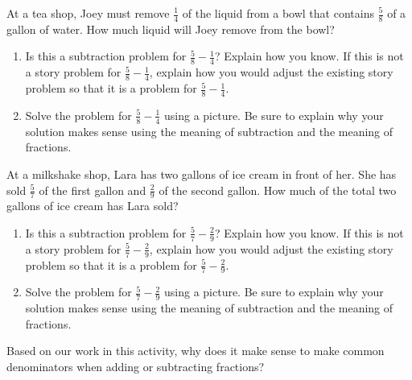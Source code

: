 \documentclass[nooutcomes,noauthor, handout]{ximera}
\begin{document}
\begin{problem}
At a tea shop, Joey must remove $\frac{1}{4}$ of the liquid from a bowl that contains $\frac{5}{8}$ of a gallon of water. How much liquid will Joey remove from the bowl?

\begin{enumerate}
	\item Is this a subtraction problem for $\frac{5}{8} - \frac{1}{4}$? Explain how you know.  If this is not a story problem for  $\frac{5}{8} - \frac{1}{4}$, explain how you would adjust the existing story problem so that it is a problem for  $\frac{5}{8} - \frac{1}{4}$.
	\item Solve the problem for  $\frac{5}{8} - \frac{1}{4}$ using a picture. Be sure to explain why your solution makes sense using the meaning of subtraction and the meaning of fractions.
\end{enumerate}
\end{problem}




\begin{problem}
At a milkshake shop, Lara has two gallons of ice cream in front of her. She has sold $\frac{5}{7}$ of the first gallon and $\frac{2}{9}$ of the second gallon. How much of the total two gallons of ice cream has Lara sold?

\begin{enumerate}
	\item Is this a subtraction problem for $\frac{5}{7} - \frac{2}{9}$? Explain how you know.  If this is not a story problem for  $\frac{5}{7} - \frac{2}{9}$, explain how you would adjust the existing story problem so that it is a problem for  $\frac{5}{7} - \frac{2}{9}$.
	\item Solve the problem for  $\frac{5}{7} - \frac{2}{9}$ using a picture. Be sure to explain why your solution makes sense using the meaning of subtraction and the meaning of fractions.
\end{enumerate}
\end{problem}


\begin{problem}
Based on our work in this activity, why does it make sense to make common denominators when adding or subtracting fractions?
\end{problem}



\newpage
\end{document}
